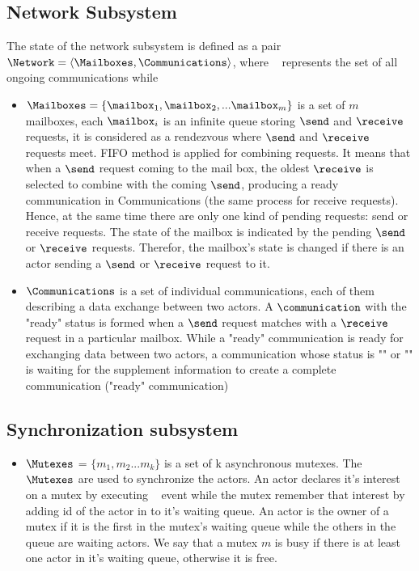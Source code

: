 \documentclass[a4paper,11pt]{article}
\begin{document}
\subsection{Network Subsystem}
The state of the network subsystem is defined as a pair $\Network = \langle \Mailboxes, \Communications \rangle$, where \Communications~ represents the set of all ongoing communications while 
\begin{itemize}[noitemsep]
\setlength{\itemsep}{3pt}
\item $\Mailboxes = \{ \mailbox_1, \mailbox_2, ... \mailbox_m \}$ is a set of $m$ mailboxes, each $\mailbox_i$ is an infinite queue storing $\send$ and $\receive$ requests, it is considered as a rendezvous
where $\send$ and $\receive$ requests meet. FIFO method is applied for combining requests. It means that when a $\send$ request coming to the mail box, the oldest $\receive$ is selected to combine with the coming $\send$, producing a ready communication in Communications (the same process for receive requests). Hence, at the same time there are only one kind of pending requests: send or receive requests. The state of the mailbox is indicated by the pending $\send$ or $\receive$ requests. Therefor, the mailbox's state is changed if there is an actor sending a $\send$ or $\receive$ request to it. 
\item $\Communications$ is a set of individual communications, each of them describing a data exchange  between two actors.  A $\communication$ with the "ready" status is formed when a $\send$ request matches with a $\receive$ request in a particular mailbox. While a "ready" communication is ready for exchanging data between two actors, a communication whose status is "\send" or "\receive" is waiting for the supplement information to create a complete communication ("ready" communication)
\end{itemize}

\subsection{Synchronization subsystem}
\begin{itemize}[noitemsep]
\setlength{\itemsep}{3pt}
 \item 
  $\Mutexes$ = $\{m_1, m_2 ... m_k \}$ is a set of k asynchronous mutexes. The $\Mutexes$ are used to synchronize the actors. An actor declares it's interest on a mutex by executing \mutexlock~ event while the mutex remember that interest by adding id of the actor in to it's waiting queue. An actor is the owner of a mutex if it is the first in the mutex's waiting queue while the others in the queue are waiting actors. We say that a mutex $m$ is busy if there is at least one actor in it's waiting queue, otherwise it is free.
 \end{itemize}
\end{document}
